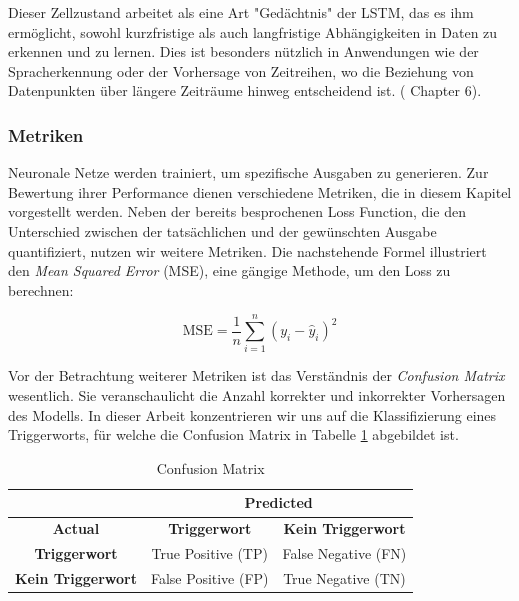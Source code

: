 \documentclass[11pt,a4paper]{article}
\begin{document}
\noindent \newline
Dieser Zellzustand arbeitet als eine Art "Gedächtnis" der LSTM, das es ihm ermöglicht, sowohl 
kurzfristige als auch langfristige Abhängigkeiten in Daten zu erkennen und zu lernen. Dies ist 
besonders nützlich in Anwendungen wie der Spracherkennung oder der Vorhersage von Zeitreihen, wo 
die Beziehung von Datenpunkten über längere Zeiträume hinweg entscheidend ist. 
(\cite{weidman2019deep} Chapter 6).

\subsubsection{Metriken}
Neuronale Netze werden trainiert, um spezifische Ausgaben zu generieren. Zur Bewertung ihrer 
Performance dienen verschiedene Metriken, die in diesem Kapitel vorgestellt werden. Neben der bereits 
besprochenen Loss Function, die den Unterschied zwischen der tatsächlichen und der gewünschten 
Ausgabe quantifiziert, nutzen wir weitere Metriken. Die nachstehende Formel illustriert den 
\textit{Mean Squared Error} (MSE), eine gängige Methode, um den Loss zu berechnen:

\begin{equation*}
    \text{MSE} = \frac{1}{n} \sum_{i=1}^{n} (y_{i} - \hat{y}_{i})^{2}
\end{equation*}

\noindent
Vor der Betrachtung weiterer Metriken ist das Verständnis der \textit{Confusion Matrix} wesentlich. 
Sie veranschaulicht die Anzahl korrekter und inkorrekter Vorhersagen des Modells. In dieser Arbeit 
konzentrieren wir uns auf die Klassifizierung eines Triggerworts, für welche die Confusion Matrix 
in Tabelle \ref{tab:confusion_matrix} abgebildet ist.

\begin{table}[H]
	\centering
	\begin{tabular}{|c|c|c|}
		\cline{2-3}
		\multicolumn{1}{c|}{} & \multicolumn{2}{c|}{\textbf{Predicted}} \\ \hline
		\textbf{Actual}     & \textbf{Triggerwort} & \textbf{Kein Triggerwort} \\ \hline
		\textbf{Triggerwort} & True Positive (TP)   & False Negative (FN)       \\ \hline
		\textbf{Kein Triggerwort} & False Positive (FP)  & True Negative (TN)        \\ \hline
	\end{tabular}
	\caption{Confusion Matrix}
	\label{tab:confusion_matrix}	
\end{table}
\end{document}

